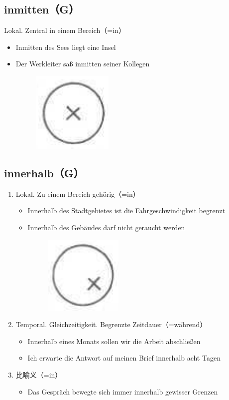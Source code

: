 \documentclass[UTF8]{report}
\begin{document}
\subsection{inmitten（G）}
Lokal. Zentral in einem Bereich（=in）
\begin{itemize}
    \item Inmitten des Sees liegt eine Insel
    \item Der Werkleiter saß inmitten seiner Kollegen
    \begin{figure}[H]
        \centering
        \includegraphics[scale=0.3]{inneri.png}
    \end{figure}
\end{itemize}

\subsection{innerhalb（G）}
\begin{enumerate}
    \item Lokal. Zu einem Bereich gehörig（=in）
    \begin{itemize}
        \item Innerhalb des Stadtgebietes ist die Fahrgeschwindigkeit begrenzt
        \item Innerhalb des Gebäudes darf nicht geraucht werden
        \begin{figure}[H]
            \centering
            \includegraphics[scale=0.3]{innern.png}
        \end{figure}
    \end{itemize}
    \item Temporal. Gleichzeitigkeit. Begrenzte Zeitdauer（=während）
    \begin{itemize}
        \item Innerhalb eines Monats sollen wir die Arbeit abschließen
        \item Ich erwarte die Antwort auf meinen Brief innerhalb acht Tagen
    \end{itemize}
    \item 比喻义（=in）
    \begin{itemize}
        \item Das Gespräch bewegte sich immer innerhalb gewisser Grenzen
    \end{itemize}
\end{enumerate}
\end{document}

